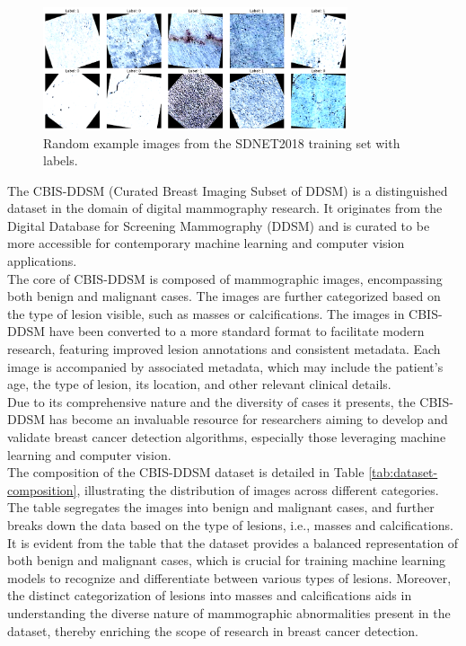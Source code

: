 \begin{figure}[h]
    \centering
    \includegraphics[width=0.8\textwidth]{figures/output.png}
    \caption{Random example images from the SDNET2018 training set with labels.}
    \label{fig:output}
\end{figure}

The CBIS-DDSM (Curated Breast Imaging Subset of DDSM) is a distinguished dataset in the domain of digital mammography research. It originates from the Digital Database for Screening Mammography (DDSM) and is curated to be more accessible for contemporary machine learning and computer vision applications.\\

The core of CBIS-DDSM is composed of mammographic images, encompassing both benign and malignant cases. The images are further categorized based on the type of lesion visible, such as masses or calcifications. The images in CBIS-DDSM have been converted to a more standard format to facilitate modern research, featuring improved lesion annotations and consistent metadata. Each image is accompanied by associated metadata, which may include the patient's age, the type of lesion, its location, and other relevant clinical details.\\

Due to its comprehensive nature and the diversity of cases it presents, the CBIS-DDSM has become an invaluable resource for researchers aiming to develop and validate breast cancer detection algorithms, especially those leveraging machine learning and computer vision.\\

The composition of the CBIS-DDSM dataset is detailed in Table \ref{tab:dataset-composition}, illustrating the distribution of images across different categories. The table segregates the images into benign and malignant cases, and further breaks down the data based on the type of lesions, i.e., masses and calcifications. It is evident from the table that the dataset provides a balanced representation of both benign and malignant cases, which is crucial for training machine learning models to recognize and differentiate between various types of lesions. Moreover, the distinct categorization of lesions into masses and calcifications aids in understanding the diverse nature of mammographic abnormalities present in the dataset, thereby enriching the scope of research in breast cancer detection.\\

